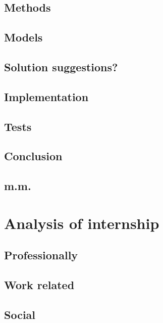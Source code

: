 \section{Methods}
\section{Models}
\section{Solution suggestions?}
\section{Implementation}
\section{Tests}
\section{Conclusion}
\section{m.m.}

\chapter{Analysis of internship}
\section{Professionally}
\section{Work related}
\section{Social}